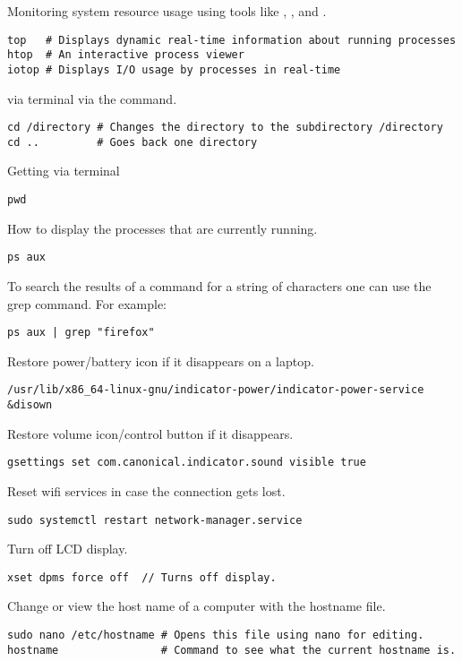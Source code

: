 Monitoring system resource usage using tools like , , and .
\begin{lstlisting}
top   # Displays dynamic real-time information about running processes
htop  # An interactive process viewer
iotop # Displays I/O usage by processes in real-time
\end{lstlisting}

 via terminal via the command.
\begin{lstlisting}
cd /directory # Changes the directory to the subdirectory /directory
cd ..         # Goes back one directory
\end{lstlisting}

Getting  via terminal
\begin{lstlisting}
pwd
\end{lstlisting}

How to display the processes that are currently running.
\begin{lstlisting}
ps aux
\end{lstlisting}

To search the results of a command for a string of characters one can use the grep command. For example:
\begin{lstlisting}
ps aux | grep "firefox"
\end{lstlisting}

Restore power/battery icon if it disappears on a laptop.
\begin{lstlisting}
/usr/lib/x86_64-linux-gnu/indicator-power/indicator-power-service &disown 
\end{lstlisting}

Restore volume icon/control button if it disappears.
\begin{lstlisting}
gsettings set com.canonical.indicator.sound visible true
\end{lstlisting}

Reset wifi services in case the connection gets lost.
\begin{lstlisting}
sudo systemctl restart network-manager.service
\end{lstlisting}

Turn off LCD display.
\begin{lstlisting}
xset dpms force off  // Turns off display.
\end{lstlisting}

Change or view the host name of a computer with the hostname file.
\begin{lstlisting}
sudo nano /etc/hostname # Opens this file using nano for editing.
hostname                # Command to see what the current hostname is.
\end{lstlisting}








